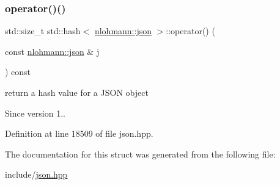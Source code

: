 \subsubsection{\texorpdfstring{operator()()}{operator()()}}
{\footnotesize\ttfamily std\+::size\+\_\+t std\+::hash$<$ \hyperlink{namespacenlohmann_a2bfd99e845a2e5cd90aeaf1b1431f474}{nlohmann\+::json} $>$\+::operator() (\begin{DoxyParamCaption}\item[{const \hyperlink{namespacenlohmann_a2bfd99e845a2e5cd90aeaf1b1431f474}{nlohmann\+::json} \&}]{j }\end{DoxyParamCaption}) const\hspace{0.3cm}{\ttfamily [inline]}}



return a hash value for a J\+S\+ON object 

\begin{DoxySince}{Since}
version 1.. 
\end{DoxySince}


Definition at line 18509 of file json.\+hpp.



The documentation for this struct was generated from the following file\+:\begin{DoxyCompactItemize}
\item 
include/\hyperlink{json_8hpp}{json.\+hpp}\end{DoxyCompactItemize}
